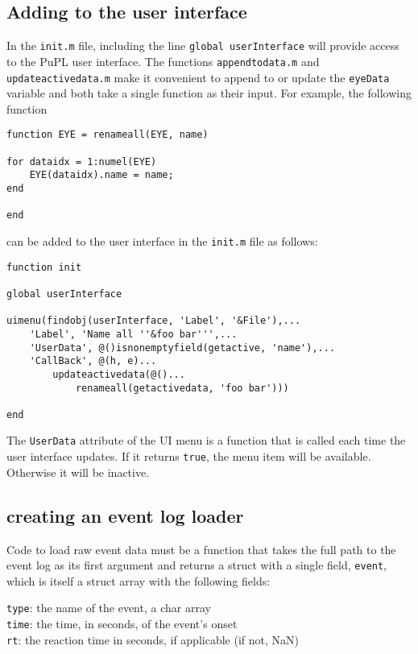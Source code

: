 \documentclass{article}
\begin{document}
\subsection{Adding to the user interface}
In the \texttt{init.m} file, including the line \texttt{global userInterface} will provide access to the PuPL user interface. The functions \texttt{appendtodata.m} and \texttt{updateactivedata.m} make it convenient to append to or update the \texttt{eyeData} variable and both take a single function as their input. For example, the following function
\begin{verbatim}
function EYE = renameall(EYE, name)

for dataidx = 1:numel(EYE)
    EYE(dataidx).name = name;
end

end
\end{verbatim}
can be added to the user interface in the \texttt{init.m} file as follows:
\begin{verbatim}
function init

global userInterface

uimenu(findobj(userInterface, 'Label', '&File'),...
    'Label', 'Name all ''&foo bar''',...
    'UserData', @()isnonemptyfield(getactive, 'name'),...
    'CallBack', @(h, e)...
        updateactivedata(@()...
            renameall(getactivedata, 'foo bar')))

end
\end{verbatim}
The \texttt{UserData} attribute of the UI menu is a function that is called each time the user interface updates. If it returns \texttt{true}, the menu item will be available. Otherwise it will be inactive.
\subsection{creating an event log loader} \label{event_log_loader}
Code to load raw event data must be a function that takes the full path to the event log as its first argument and returns a struct with a single field, \texttt{event}, which is itself a struct array with the following fields:
\begin{addmargin}[1em]{0em}
\texttt{type}: the name of the event, a char array\\
\texttt{time}: the time, in seconds, of the event's onset\\
\texttt{rt}: the reaction time in seconds, if applicable (if not, NaN)
\end{addmargin}
\end{document}
